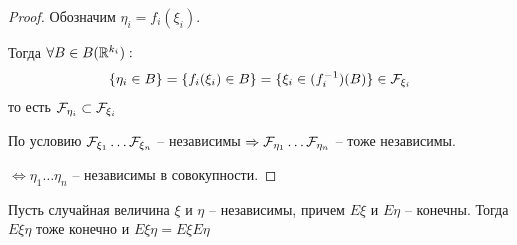 \begin{proof}
  Обозначим $\eta_i = f_i (\xi_i)$. 

  Тогда $\forall B \in B(\mathbb{R}^{k_i}):$
  \begin{align*}
    \{ \eta_i \in B \} = \{ f_i (\xi_i) \in B \} = \{ \xi_i \in (f_i^{-1}) (B) \} \in \mathcal{F}_{\xi_i}
  \end{align*}
  то есть $\mathcal{F}_{\eta_i} \subset \mathcal{F}_{\xi_i}$

  По условию $\mathcal{F}_{\xi_1} \ldots \mathcal{F}_{\xi_n}$ -- независимы
  $\Rightarrow \mathcal{F}_{\eta_1} \ldots \mathcal{F}_{\eta_n}$ -- тоже независимы.

  $\Leftrightarrow \eta_1 \ldots \eta_n$ -- независимы в совокупности.
\end{proof}

\begin{theorem}
  Пусть случайная величина $\xi$ и $\eta$ -- независимы, причем $E \xi$ и $E \eta$ -- конечны. 
  Тогда $E \xi \eta$ тоже конечно и $E \xi \eta = E \xi E \eta$
\end{theorem}

